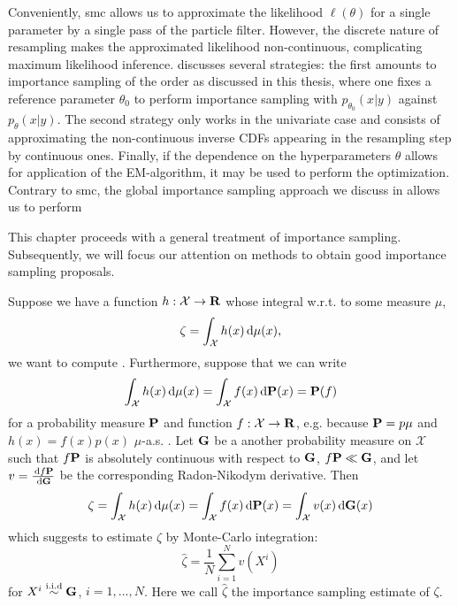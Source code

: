 Conveniently, \gls{smc} allows us to approximate the likelihood $\ell(\theta)$ for a single parameter by a single pass of the particle filter. However, the discrete nature of resampling makes the approximated likelihood non-continuous, complicating maximum likelihood inference. \cite[Chapter 14]{Chopin2020Introduction} discusses several strategies: the first amounts to importance sampling of the order as discussed in this thesis, where one fixes a reference parameter $\theta_{0}$ to perform importance sampling with $p_{\theta_{0}}(x|y)$ against $p_{\theta}(x|y)$. The second strategy only works in the univariate case and consists of approximating the non-continuous inverse CDFs appearing in the resampling step by continuous ones. Finally, if the dependence on the hyperparameters $\theta$ allows for application of the EM-algorithm, it may be used to perform the optimization. 
Contrary to \gls{smc}, the global importance sampling approach we discuss in  allows us to perform 

This chapter proceeds with a general treatment of importance sampling. Subsequently, we will focus our attention on methods to obtain good importance sampling proposals. 

Suppose we have a function $h: \mathcal X \to \R$ whose integral w.r.t. to some measure $\mu$, $$\zeta = \int_{\mathcal X} h(x) \d\mu(x),$$ we want to compute .
Furthermore, suppose that we can write
$$
    \int_{\mathcal X} h(x) \d \mu(x) = \int_{\mathcal X} f(x) \d \P(x) = \P (f)
$$
for a probability measure $\P$ and function $f: \mathcal X \to \R$, e.g. because $\P = p \mu$ and $h(x) = f(x) p(x)$ $\mu$-a.s. .
Let $\G$ be a another probability measure on $\mathcal X$ such that $f\P$ is absolutely continuous with respect to $\G$, $f\P \ll \G$, and let $v = \frac{\d f\P}{\d\G}$ be the corresponding Radon-Nikodym derivative. Then
$$
    \zeta = \int_{\mathcal X} h(x) \d \mu(x) = \int_{\mathcal X} f(x) \d \P(x) = \int_{\mathcal X} v(x)\d\G(x)
$$
which suggests to estimate $\zeta$ by Monte-Carlo integration: $$\hat \zeta = \frac 1 N \sum_{i=1}^{N} v(X^{i})$$ for $X^{i} \iid \G$, $i = 1, \dots, N$. Here we call $\hat \zeta$ the importance sampling estimate of $\zeta$. 

